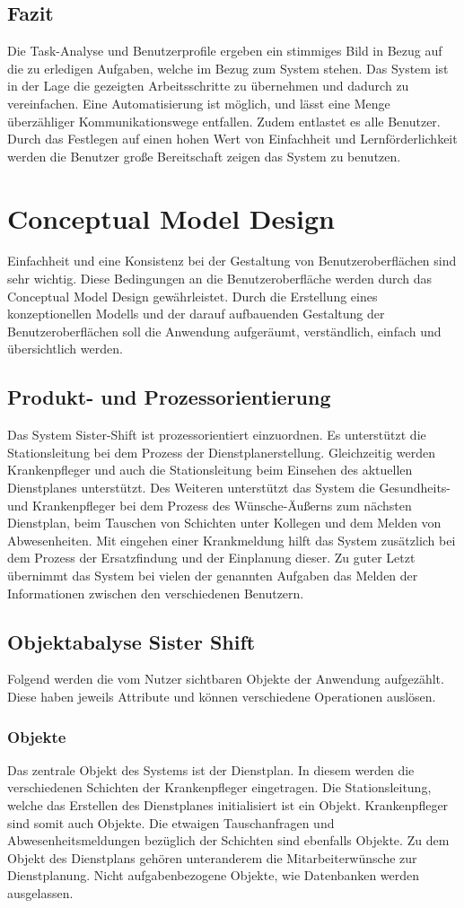 \documentclass[11pt,
paper=a4,
bibtotocnumbered,	  %
liststotocnumbered,  %
DIV=calc,		  %
tablecaptionabove,	  %
headinclude,
]{article}
\begin{document}
\subsection{Fazit}
Die Task-Analyse und Benutzerprofile ergeben ein stimmiges Bild in Bezug auf die zu erledigen Aufgaben, welche im Bezug zum System stehen. Das System ist in der Lage die gezeigten Arbeitsschritte zu übernehmen und dadurch zu vereinfachen. Eine Automatisierung ist möglich, und lässt eine Menge überzähliger Kommunikationswege entfallen. Zudem entlastet es alle Benutzer. Durch das Festlegen auf einen hohen Wert von Einfachheit und Lernförderlichkeit werden die Benutzer große Bereitschaft zeigen das System zu benutzen.
\section{Conceptual Model Design}
Einfachheit und eine Konsistenz bei der Gestaltung von Benutzeroberflächen sind sehr wichtig. Diese Bedingungen an die Benutzeroberfläche werden durch das Conceptual Model Design gewährleistet. Durch die Erstellung eines konzeptionellen Modells und der darauf aufbauenden Gestaltung der Benutzeroberflächen soll die Anwendung aufgeräumt, verständlich, einfach und übersichtlich werden.
\subsection{Produkt- und Prozessorientierung}
Das System Sister-Shift ist prozessorientiert einzuordnen. Es unterstützt die Stationsleitung bei dem Prozess der Dienstplanerstellung. Gleichzeitig werden Krankenpfleger und auch die Stationsleitung beim Einsehen des aktuellen Dienstplanes unterstützt. Des Weiteren unterstützt das System die Gesundheits- und Krankenpfleger bei dem Prozess des Wünsche-Äußerns zum nächsten Dienstplan, beim Tauschen von Schichten unter Kollegen und dem Melden von Abwesenheiten. Mit eingehen einer Krankmeldung hilft das System zusätzlich bei dem Prozess der Ersatzfindung und der Einplanung dieser. Zu guter Letzt übernimmt das System bei vielen der genannten Aufgaben das Melden der Informationen zwischen den verschiedenen Benutzern.
\subsection{Objektabalyse Sister Shift}
Folgend werden die vom Nutzer sichtbaren Objekte der Anwendung aufgezählt. Diese haben jeweils Attribute und können verschiedene Operationen auslösen.
\subsubsection{Objekte}
Das zentrale Objekt des Systems ist der Dienstplan. In diesem werden die verschiedenen Schichten der Krankenpfleger eingetragen. Die Stationsleitung, welche das Erstellen des Dienstplanes initialisiert ist ein Objekt. Krankenpfleger sind somit auch Objekte. Die etwaigen Tauschanfragen und Abwesenheitsmeldungen bezüglich der Schichten sind ebenfalls Objekte. Zu dem Objekt des Dienstplans gehören unteranderem die Mitarbeiterwünsche zur Dienstplanung. Nicht aufgabenbezogene Objekte, wie Datenbanken werden ausgelassen. 
\end{document}
